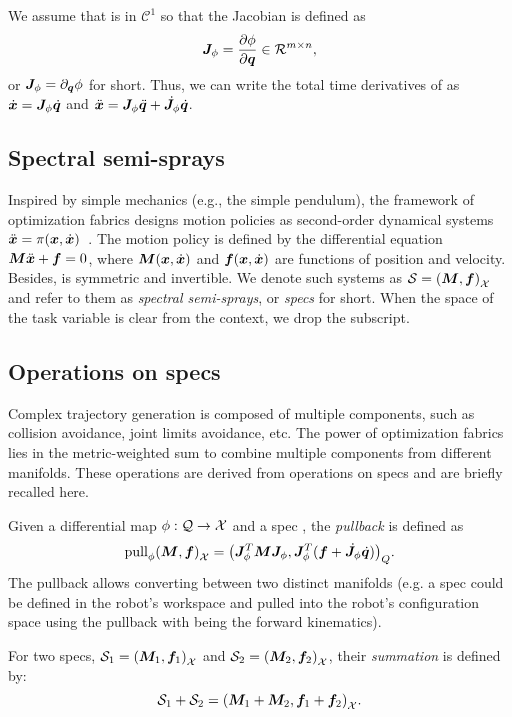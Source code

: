 We assume that \map{} is in $\mathcal{C}^1$ so that the Jacobian is
defined as
\begin{equation}
  \bm{J}_{\phi} = \frac{\partial\phi}{\partial\bm{q}} \in \mathcal{R}^{m\times n}, 
\end{equation}
or $\bm{J}_{\phi} = \partial_{\bm{q}}\phi$ for short.
Thus, we can write the total time derivatives of \x{} as
$\dot{\bm{x}} = \bm{J}_{\phi}\dot{\bm{q}}$ and $\ddot{\bm{x}} = \bm{J}_{\phi}\ddot{\bm{q}} + \dot{\bm{J}}_{\phi}\dot{\bm{q}}$.
%
\subsection{Spectral semi-sprays}%
\label{sub:semi_spectral_sprays}
%
Inspired by simple mechanics (e.g., the simple pendulum), the framework of optimization
fabrics designs motion policies as second-order dynamical
systems $\ddot{\bm{x}} = \pi(\bm{x},\dot{\bm{x}})$~\cite{Cheng2020,Ratliff2020}.
The motion policy is defined by the differential equation
$\bm{M}\ddot{\bm{x}} + \bm{f} = 0$, where $\bm{M}(\bm{x},\dot{\bm{x}})$ and $\bm{f}(\bm{x},\dot{\bm{x}})$ are functions of position and
velocity. Besides, \M{} is symmetric and invertible. We denote such systems as $\mathcal{S} = \left(\bm{M},\bm{f}\right)_{\mathcal{X}}$ and
refer to them as \textit{spectral semi-sprays}, or \textit{specs} for short.  When the space of
the task variable is clear from the context, we drop the subscript. 

\subsection{Operations on specs}%
\label{sub:operations_on_specs}
%
%
Complex trajectory generation is composed of multiple components, such as collision avoidance, joint limits
avoidance, etc. The power of optimization fabrics lies in the metric-weighted sum to
combine multiple components from different manifolds.
These operations are derived from operations on specs and are briefly recalled here.

Given a differential map $\phi: \mathcal{Q}\rightarrow\mathcal{X}$ and a spec \spec{}, the \textit{pullback}
is defined as 
\begin{equation}
  \textrm{pull}_{\phi}{\left(\bm{M},\bm{f}\right)_{\mathcal{X}}} = {\left(\bm{J}^T_{\phi}\bm{M}\bm{J}_{\phi}, \bm{J}^T_{\phi}(\bm{f}+\dot{\bm{J}}_{\phi}\dot{\bm{q}})\right)}_{Q}.
\end{equation}
The pullback allows converting between two distinct manifolds (e.g. a spec could be 
defined in the robot's workspace and pulled into the robot's configuration space using
the pullback with \map{} being the forward kinematics).

For two specs, $\mathcal{S}_1 = {\left(\bm{M}_1,\bm{f}_1\right)}_{\mathcal{X}}$ and 
$\mathcal{S}_2 = {\left(\bm{M}_2,\bm{f}_2\right)}_{\mathcal{X}}$, their \textit{summation} is defined by:
\begin{equation}
  \mathcal{S}_1 + \mathcal{S}_2 = {\left(\bm{M}_1 + \bm{M}_2, \bm{f}_1 + \bm{f}_2\right)}_{\mathcal{X}}.
  \label{eq:specs_summation}
\end{equation}
%

